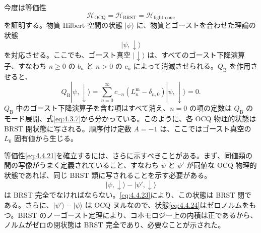 今度は等価性
\begin{equation}
\mathcal H_{\mathrm{OCQ}}=\mathcal H_{\mathrm{BRST}}
=\mathcal H_{\text{light-cone}}
\tag{4.4.21}\label{eq:4.4.21}
\end{equation}
を証明する。物質 Hilbert 空間の状態 $|\psi\rangle$ に、物質とゴーストを合わせた理論の状態
\begin{equation}
|\psi,\downarrow\rangle
\tag{4.4.22}\label{eq:4.4.22}
\end{equation}
を対応させる。ここでも、ゴースト真空 $|\downarrow\rangle$ は、すべてのゴースト下降演算子、すなわち $n\geq0$ の $b_n$ と $n>0$ の $c_n$ によって消滅させられる。$Q_{\mathrm B}$ を作用させると、
\begin{equation}
Q_{\mathrm B}|\psi,\downarrow\rangle
=\sum_{n=0}^{\infty}c_{-n}(L^{\mathrm m}_n-\delta_{n,0})|\psi,\downarrow\rangle=0.
\tag{4.4.23}\label{eq:4.4.23}
\end{equation}
$Q_{\mathrm B}$ 中のゴースト下降演算子を含む項はすべて消え、$n=0$ の項の定数は $Q_{\mathrm B}$ のモード展開、式\eqref{eq:4.3.7}から分かっている。このように、各 OCQ 物理的状態は BRST 閉状態に写される。順序付け定数 $A=-1$ は、ここではゴースト真空の $L_0$ 固有値から生じる。

等価性\eqref{eq:4.4.21}を確立するには、さらに示すべきことがある。まず、同値類の間の写像がうまく定義されていること、すなわち $\psi$ と $\psi'$ が同値な OCQ 物理的状態であれば、同じ BRST 類に写されることを示す必要がある。
\begin{equation}
|\psi,\downarrow\rangle-|\psi',\downarrow\rangle
\tag{4.4.24}\label{eq:4.4.24}
\end{equation}
は BRST 完全でなければならない。\eqref{eq:4.4.23}により、この状態は BRST 閉である。さらに、$|\psi'\rangle-|\psi\rangle$ は OCQ ヌルなので、状態\eqref{eq:4.4.24}はゼロノルムをもつ。BRST のノーゴースト定理により、コホモロジー上の内積は正であるから、ノルムがゼロの閉状態は BRST 完全であり、必要なことが示された。

